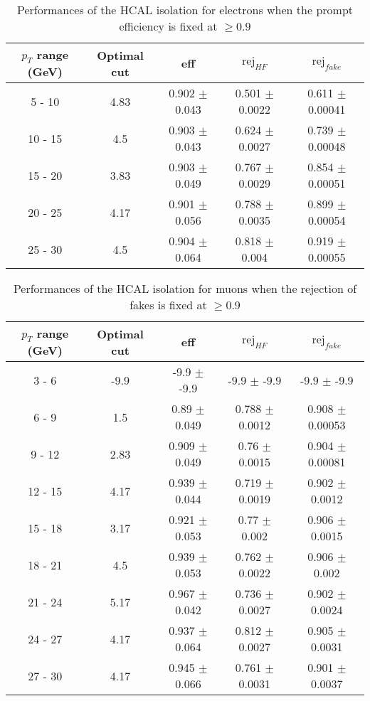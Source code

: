 \begin{table}[htbp]
   \centering
   \begin{tabular}{|c|c|c|c|c|}
      \hline
      $p_T$ range (GeV) & Optimal cut & eff & $\textrm{rej}_{HF}$ & $\textrm{rej}_{fake}$ \\
      \hline
      5 - 10 & 4.83 & 0.902 $\pm$ 0.043 & 0.501 $\pm$ 0.0022 & 0.611 $\pm$ 0.00041 \\
      \hline
      10 - 15 & 4.5 & 0.903 $\pm$ 0.043 & 0.624 $\pm$ 0.0027 & 0.739 $\pm$ 0.00048 \\
      \hline
      15 - 20 & 3.83 & 0.903 $\pm$ 0.049 & 0.767 $\pm$ 0.0029 & 0.854 $\pm$ 0.00051 \\
      \hline
      20 - 25 & 4.17 & 0.901 $\pm$ 0.056 & 0.788 $\pm$ 0.0035 & 0.899 $\pm$ 0.00054 \\
      \hline
      25 - 30 & 4.5 & 0.904 $\pm$ 0.064 & 0.818 $\pm$ 0.004 & 0.919 $\pm$ 0.00055 \\
      \hline
   \end{tabular}
   \caption{\small{Performances of the HCAL isolation for electrons when the prompt efficiency is fixed at $\geq 0.9$}\label{tab:hcal_elec_eff}}
\end{table}






\begin{table}[htbp]
   \centering
   \begin{tabular}{|c|c|c|c|c|}
      \hline
      $p_T$ range (GeV) & Optimal cut & eff & $\textrm{rej}_{HF}$ & $\textrm{rej}_{fake}$ \\
      \hline
      3 - 6 & -9.9 & -9.9 $\pm$ -9.9 & -9.9 $\pm$ -9.9 & -9.9 $\pm$ -9.9 \\
      \hline
      6 - 9 & 1.5 & 0.89 $\pm$ 0.049 & 0.788 $\pm$ 0.0012 & 0.908 $\pm$ 0.00053 \\
      \hline
      9 - 12 & 2.83 & 0.909 $\pm$ 0.049 & 0.76 $\pm$ 0.0015 & 0.904 $\pm$ 0.00081 \\
      \hline
      12 - 15 & 4.17 & 0.939 $\pm$ 0.044 & 0.719 $\pm$ 0.0019 & 0.902 $\pm$ 0.0012 \\
      \hline
      15 - 18 & 3.17 & 0.921 $\pm$ 0.053 & 0.77 $\pm$ 0.002 & 0.906 $\pm$ 0.0015 \\
      \hline
      18 - 21 & 4.5 & 0.939 $\pm$ 0.053 & 0.762 $\pm$ 0.0022 & 0.906 $\pm$ 0.002 \\
      \hline
      21 - 24 & 5.17 & 0.967 $\pm$ 0.042 & 0.736 $\pm$ 0.0027 & 0.902 $\pm$ 0.0024 \\
      \hline
      24 - 27 & 4.17 & 0.937 $\pm$ 0.064 & 0.812 $\pm$ 0.0027 & 0.905 $\pm$ 0.0031 \\
      \hline
      27 - 30 & 4.17 & 0.945 $\pm$ 0.066 & 0.761 $\pm$ 0.0031 & 0.901 $\pm$ 0.0037 \\
      \hline
   \end{tabular}
   \caption{\small{Performances of the HCAL isolation for muons when the rejection of fakes is fixed at $\geq 0.9$}\label{tab:hcal_muon_pureFake}}
\end{table}






